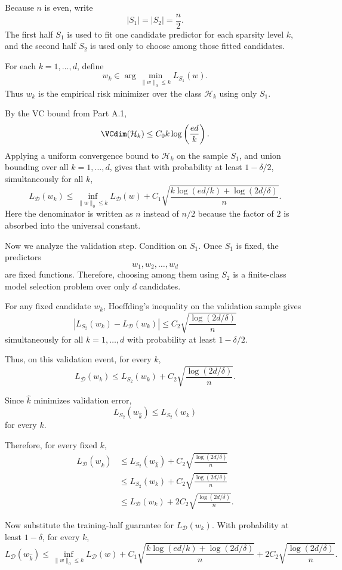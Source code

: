 \documentclass[11pt]{article}
\newcommand{\calD}{\mathcal{D}}
\newcommand{\calH}{\mathcal{H}}
\begin{document}
\begin{solutionbox}

Because $n$ is even, write
\[
|S_1|=|S_2|=\frac n2.
\]
The first half $S_1$ is used to fit one candidate predictor for each sparsity level $k$, and the second half $S_2$ is used only to choose among those fitted candidates.

\medskip

For each $k=1,\dots,d$, define
\[
w_k\in \arg\min_{\|w\|_0\le k}L_{S_1}(w).
\]
Thus $w_k$ is the empirical risk minimizer over the class $\calH_k$ using only $S_1$.

By the VC bound from Part A.1,
\[
\VCdim(\calH_k)
\le
C_0k\log\left(\frac{ed}{k}\right).
\]
Applying a uniform convergence bound to $\calH_k$ on the sample $S_1$, and union bounding over all $k=1,\dots,d$, gives that with probability at least $1-\delta/2$, simultaneously for all $k$,
\[
L_{\calD}(w_k)
\le
\inf_{\|w\|_0\le k}L_{\calD}(w)
+
C_1
\sqrt{
\frac{
k\log(ed/k)+\log(2d/\delta)
}{
n}
}.
\]
Here the denominator is written as $n$ instead of $n/2$ because the factor of $2$ is absorbed into the universal constant.

\medskip

Now we analyze the validation step. Condition on $S_1$. Once $S_1$ is fixed, the predictors
\[
w_1,w_2,\dots,w_d
\]
are fixed functions. Therefore, choosing among them using $S_2$ is a finite-class model selection problem over only $d$ candidates.

For any fixed candidate $w_k$, Hoeffding's inequality on the validation sample gives
\[
\left|L_{S_2}(w_k)-L_{\calD}(w_k)\right|
\le
C_2\sqrt{\frac{\log(2d/\delta)}{n}}
\]
simultaneously for all $k=1,\dots,d$ with probability at least $1-\delta/2$.

Thus, on this validation event, for every $k$,
\[
L_{\calD}(w_k)
\le
L_{S_2}(w_k)
+
C_2\sqrt{\frac{\log(2d/\delta)}{n}}.
\]

Since $\hat k$ minimizes validation error,
\[
L_{S_2}(w_{\hat k})
\le
L_{S_2}(w_k)
\]
for every $k$.

Therefore, for every fixed $k$,
\begin{align*}
L_{\calD}(w_{\hat k})
&\le
L_{S_2}(w_{\hat k})
+
C_2\sqrt{\frac{\log(2d/\delta)}{n}}\\
&\le
L_{S_2}(w_k)
+
C_2\sqrt{\frac{\log(2d/\delta)}{n}}\\
&\le
L_{\calD}(w_k)
+
2C_2\sqrt{\frac{\log(2d/\delta)}{n}}.
\end{align*}

Now substitute the training-half guarantee for $L_{\calD}(w_k)$. With probability at least $1-\delta$, for every $k$,
\[
L_{\calD}(w_{\hat k})
\le
\inf_{\|w\|_0\le k}L_{\calD}(w)
+
C_1
\sqrt{
\frac{
k\log(ed/k)+\log(2d/\delta)
}{
n}
}
+
2C_2
\sqrt{
\frac{\log(2d/\delta)}{n}
}.
\]


\end{solutionbox}
\end{document}
